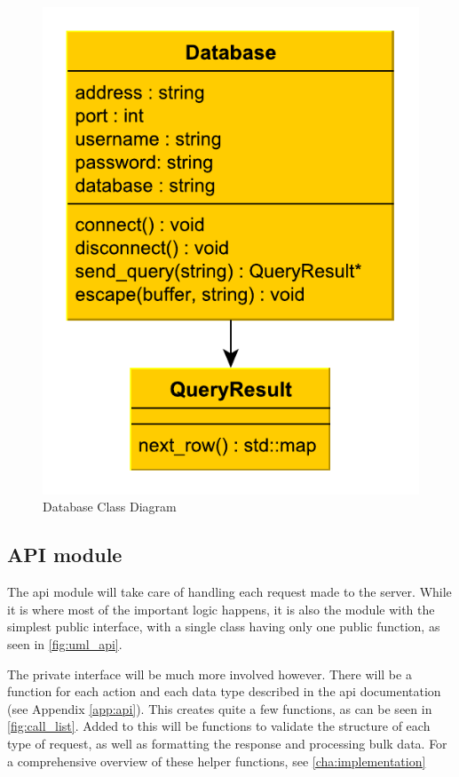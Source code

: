 \begin{figure}[ht]
\includegraphics[scale=1]{img/database.pdf}
\caption{Database Class Diagram}
\label{fig:uml_database}
\end{figure}

\subsection{API module}

The \ac{api} module will take care of handling each request made to the server. While it is where most of the important logic happens, it is also the module with the simplest public interface, with a single class having only one public function, as seen in \autoref{fig:uml_api}.

The private interface will be much more involved however. There will be a function for each action and each data type described in the \ac{api} documentation (see Appendix \autoref{app:api}).
This creates quite a few functions, as can be seen in \autoref{fig:call_list}. Added to this will be functions to validate the structure of each type of request, as well as formatting the response and processing bulk data.
For a comprehensive overview of these helper functions, see \autoref{cha:implementation}

